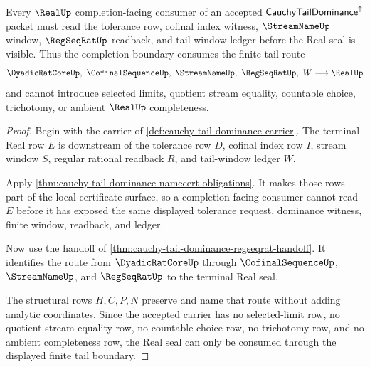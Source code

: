 \begin{theorem}
\label{thm:cauchy-tail-dominance-real-seal-consumption}
Every $\RealUp$ completion-facing consumer of an accepted $\mathsf{CauchyTailDominance}^{\uparrow}$ packet must read the tolerance row, cofinal index witness, $\StreamNameUp$ window, $\RegSeqRatUp$ readback, and tail-window ledger before the Real seal is visible. Thus the completion boundary consumes the finite tail route
$$
\DyadicRatCoreUp,\ \CofinalSequenceUp,\ \StreamNameUp,\ \RegSeqRatUp,\ W \longrightarrow \RealUp
$$
and cannot introduce selected limits, quotient stream equality, countable choice, trichotomy, or ambient $\RealUp$ completeness.
\end{theorem}
\begin{proof}
Begin with the carrier of \autoref{def:cauchy-tail-dominance-carrier}. The terminal Real row $E$ is downstream of the tolerance row $D$, cofinal index row $I$, stream window $S$, regular rational readback $R$, and tail-window ledger $W$.

Apply \autoref{thm:cauchy-tail-dominance-namecert-obligations}. It makes those rows part of the local certificate surface, so a completion-facing consumer cannot read $E$ before it has exposed the same displayed tolerance request, dominance witness, finite window, readback, and ledger.

Now use the handoff of \autoref{thm:cauchy-tail-dominance-regseqrat-handoff}. It identifies the route from $\DyadicRatCoreUp$ through $\CofinalSequenceUp$, $\StreamNameUp$, and $\RegSeqRatUp$ to the terminal Real seal.

The structural rows $H,C,P,N$ preserve and name that route without adding analytic coordinates. Since the accepted carrier has no selected-limit row, no quotient stream equality row, no countable-choice row, no trichotomy row, and no ambient completeness row, the Real seal can only be consumed through the displayed finite tail boundary.
\end{proof}


